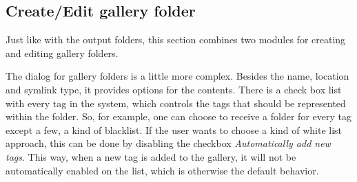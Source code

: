 \subsection{Create/Edit gallery folder}
\def\kapitelautor{Erik Ritschl}

Just like with the output folders, this section combines two modules for creating and editing gallery folders.

The dialog for gallery folders is a little more complex. Besides the name, location and symlink type, it provides options for the contents. There is a check box list with every tag in the system, which controls the tags that should be represented within the folder. So, for example, one can choose to receive a folder for every tag except a few, a kind of blacklist. If the user wants to choose a kind of white list approach, this can be done by disabling the checkbox \emph{Automatically add new tags}. This way, when a new tag is added to the gallery, it will not be automatically enabled on the list, which is otherwise the default behavior.
